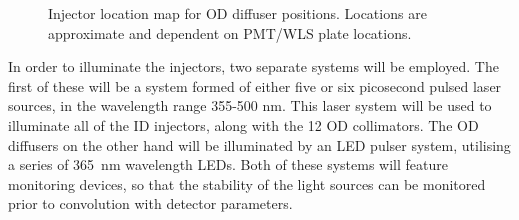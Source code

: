\documentclass[a4paper,11pt]{article}
\begin{document}
\begin{figure}[h!]
\centering
{}
\caption{Injector location map for OD diffuser positions. Locations are approximate and dependent on PMT/WLS plate locations.}\label{fig:ODdiffmap}
\end{figure}

In order to illuminate the injectors, two separate systems will be employed. The first of these will be a system formed of either five or six picosecond pulsed laser sources, in the wavelength range 355-500 nm. This laser system will be used to illuminate all of the ID injectors, along with the 12 OD collimators. The OD diffusers on the other hand will be illuminated by an LED pulser system, utilising a series of 365~nm wavelength LEDs. Both of these systems will feature monitoring devices, so that the stability of the light sources can be monitored prior to convolution with detector parameters.
\end{document}
